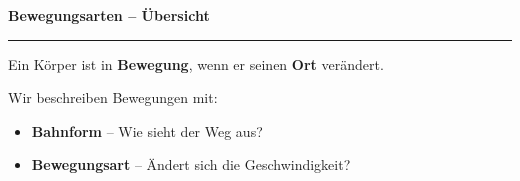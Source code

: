 \documentclass[11pt, a4paper]{article}
\begin{document}

\begin{center}
{\Large\bfseries\textcolor{physik}{Bewegungsarten -- Übersicht}}
\end{center}
\vspace{0.3em}
\hrule
\vspace{0.8em}


\begin{merkkasten}[title={\small\bfseries\textcolor{white}{Definition}}, coltitle=white, attach boxed title to top left={yshift=-2mm, xshift=5mm}, boxed title style={colback=physik, arc=0pt}]
Ein Körper ist in \textbf{Bewegung}, wenn er seinen \textbf{Ort} verändert.

Wir beschreiben Bewegungen mit:
\begin{itemize}[leftmargin=1.5em, itemsep=1pt, topsep=2pt]
    \item \textbf{Bahnform} -- Wie sieht der Weg aus?
    \item \textbf{Bewegungsart} -- Ändert sich die Geschwindigkeit?
\end{itemize}
\end{merkkasten}

\vspace{0.5em}

\end{document}
